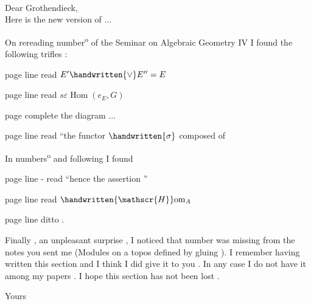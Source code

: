 \begin{flushright}
\\
\end{flushright}
Dear Grothendieck,\\

Here is the new version of ...

On rereading number\textsuperscript{o}  of the Seminar on Algebraic Geometry  IV I found the following trifles :

page  line  read \(E'\handwritten{\vee} E'' = E\)

page  line  read \(s\varepsilon\operatorname{Hom}(e_E,G)\)

page  complete the diagram ...

page  line  read ``the functor \(\handwritten{\sigma}\) composed of

In numbers\textsuperscript{o}  and following I found

page  line - read ``hence the assertion ''

page  line  read \(\handwritten{\mathscr{H}}\mathrm{om}_A\)

page  line  ditto .

\reversemarginpar
{}
\normalmarginpar
Finally , an unpleasant surprise , I noticed that number  was missing from the notes you sent me (Modules on a topos defined by gluing ). I remember having written this section and I think I did give it to you . In any case I do not have it among my papers . I hope this section has not been lost .

\begin{flushright}
Yours\\
\\
\end{flushright}
